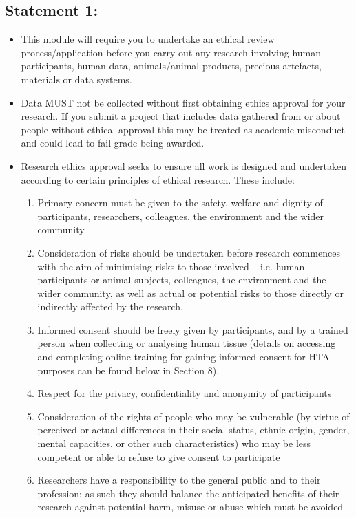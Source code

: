 \documentclass{MDXHandbook}
\begin{document}
\subsection*{Statement 1:}
\begin{itemize}
	\item This module will require you to undertake an ethical review process/application before you carry out any research involving human participants, human data, animals/animal products, precious artefacts, materials or data systems.
	\item Data MUST not be collected without first obtaining ethics approval for your research. If you submit a project that includes data gathered from or about people without ethical approval this may be treated as academic misconduct and could lead to fail grade being awarded.
	\item Research ethics approval seeks to ensure all work is designed and undertaken according to certain principles of ethical research. These include: 
		\begin{enumerate}
			\item Primary concern must be given to the safety, welfare and dignity of participants, researchers, colleagues, the environment and the wider community 
			\item Consideration of risks should be undertaken before research commences with the aim of minimising risks to those involved – i.e. human participants or animal subjects, colleagues, the environment and the wider community, as well as actual or potential risks to those directly or indirectly affected by the research.
			\item Informed consent should be freely given by participants, and by a trained person when collecting or analysing human tissue (details on accessing and completing online training for gaining informed consent for HTA purposes can be found below in Section 8).
			\item Respect for the privacy, confidentiality and anonymity of participants 
			\item Consideration of the rights of people who may be vulnerable (by virtue of perceived or actual differences in their social status, ethnic origin, gender, mental capacities, or other such characteristics) who may be less competent or able to refuse to give consent to participate
			\item Researchers have a responsibility to the general public and to their profession; as such they should balance the anticipated benefits of their research against potential harm, misuse or abuse which must be avoided 

\end{enumerate}
\end{itemize}
\end{document}

